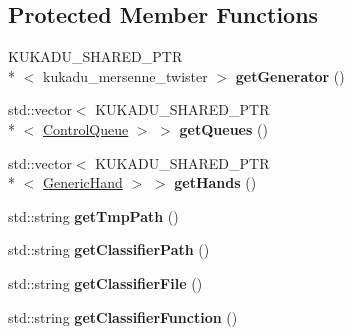 \subsection*{Protected Member Functions}
\begin{DoxyCompactItemize}
\item 
\hypertarget{classkukadu_1_1SensingController_afc0c30cc64d0683094e53856463a5a14}{K\-U\-K\-A\-D\-U\-\_\-\-S\-H\-A\-R\-E\-D\-\_\-\-P\-T\-R\\*
$<$ kukadu\-\_\-mersenne\-\_\-twister $>$ {\bfseries get\-Generator} ()}\label{classkukadu_1_1SensingController_afc0c30cc64d0683094e53856463a5a14}

\item 
\hypertarget{classkukadu_1_1SensingController_aebfb6e5ec327fd8731ad244ef22864f6}{std\-::vector$<$ K\-U\-K\-A\-D\-U\-\_\-\-S\-H\-A\-R\-E\-D\-\_\-\-P\-T\-R\\*
$<$ \hyperlink{classkukadu_1_1ControlQueue}{Control\-Queue} $>$ $>$ {\bfseries get\-Queues} ()}\label{classkukadu_1_1SensingController_aebfb6e5ec327fd8731ad244ef22864f6}

\item 
\hypertarget{classkukadu_1_1SensingController_a325861fdc90c26fb03b92ebb16fcb469}{std\-::vector$<$ K\-U\-K\-A\-D\-U\-\_\-\-S\-H\-A\-R\-E\-D\-\_\-\-P\-T\-R\\*
$<$ \hyperlink{classkukadu_1_1GenericHand}{Generic\-Hand} $>$ $>$ {\bfseries get\-Hands} ()}\label{classkukadu_1_1SensingController_a325861fdc90c26fb03b92ebb16fcb469}

\item 
\hypertarget{classkukadu_1_1SensingController_aa20053f2266322fbbd327f1bbed658dd}{std\-::string {\bfseries get\-Tmp\-Path} ()}\label{classkukadu_1_1SensingController_aa20053f2266322fbbd327f1bbed658dd}

\item 
\hypertarget{classkukadu_1_1SensingController_a9e0c56d6e75dd3c8791341e4969094dc}{std\-::string {\bfseries get\-Classifier\-Path} ()}\label{classkukadu_1_1SensingController_a9e0c56d6e75dd3c8791341e4969094dc}

\item 
\hypertarget{classkukadu_1_1SensingController_a175b6f63c4e7cf52352cb4fc4bee3786}{std\-::string {\bfseries get\-Classifier\-File} ()}\label{classkukadu_1_1SensingController_a175b6f63c4e7cf52352cb4fc4bee3786}

\item 
\hypertarget{classkukadu_1_1SensingController_a5bb031700a593fbe732da6f3d97035d4}{std\-::string {\bfseries get\-Classifier\-Function} ()}\label{classkukadu_1_1SensingController_a5bb031700a593fbe732da6f3d97035d4}


\end{DoxyCompactItemize}
